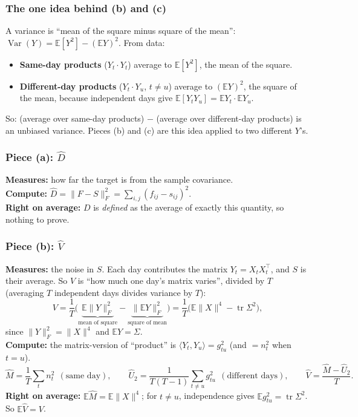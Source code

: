\documentclass[12pt]{article}
\begin{document}
\subsubsection*{The one idea behind (b) and (c)}
A variance is ``mean of the square minus square of the mean'': $\operatorname{Var}(Y)=\mathbb{E}[Y^2]-(\mathbb{E}Y)^2$. From data:
\begin{itemize}
\item \textbf{Same-day products} ($Y_t\cdot Y_t$) average to $\mathbb{E}[Y^2]$, the mean of the square.
\item \textbf{Different-day products} ($Y_t\cdot Y_u$, $t\neq u$) average to $(\mathbb{E}Y)^2$, the square of the mean,
because independent days give $\mathbb{E}[Y_tY_u]=\mathbb{E}Y_t\cdot\mathbb{E}Y_u$.
\end{itemize}
So: (average over same-day products) $-$ (average over different-day products) is an unbiased variance.
Pieces (b) and (c) are this idea applied to two different $Y$'s.

\subsubsection*{Piece (a): $\hat D$}
\textbf{Measures:} how far the target is from the sample covariance.\\
\textbf{Compute:} $\hat D=\|F-S\|_F^2=\sum_{i,j}(f_{ij}-s_{ij})^2$.\\
\textbf{Right on average:} $D$ is \emph{defined} as the average of exactly this quantity, so nothing to prove.

\subsubsection*{Piece (b): $\hat V$}
\textbf{Measures:} the noise in $S$. Each day contributes the matrix $Y_t=X_tX_t^\top$, and $S$ is their average.
So $V$ is ``how much one day's matrix varies'', divided by $T$ (averaging $T$ independent days divides
variance by $T$):
\[
V=\frac1T\Big(\underbrace{\mathbb{E}\|Y\|_F^2}_{\text{mean of square}}-\underbrace{\|\mathbb{E}Y\|_F^2}_{\text{square of mean}}\Big)
=\frac1T\Big(\mathbb{E}\|X\|^4-\operatorname{tr}\Sigma^2\Big),
\]
since $\|Y\|_F^2=\|X\|^4$ and $\mathbb{E}Y=\Sigma$.\\
\textbf{Compute:} the matrix-version of ``product'' is $\langle Y_t,Y_u\rangle=g_{tu}^2$ (and $=n_t^2$ when $t=u$).
\[
\hat M=\frac1T\sum_tn_t^2\ \ (\text{same day}),\qquad
\hat U_2=\frac{1}{T(T-1)}\sum_{t\neq u}g_{tu}^2\ \ (\text{different days}),\qquad
\hat V=\frac{\hat M-\hat U_2}{T}.
\]
\textbf{Right on average:} $\mathbb{E}\hat M=\mathbb{E}\|X\|^4$; for $t\neq u$, independence gives $\mathbb{E}g_{tu}^2=\operatorname{tr}\Sigma^2$. So $\mathbb{E}\hat V=V$.
\end{document}

